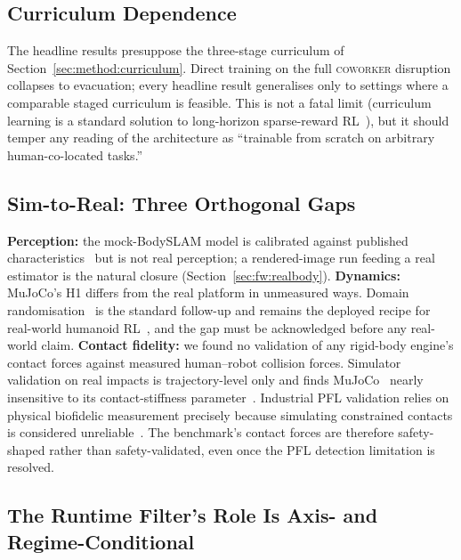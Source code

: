 \documentclass[11pt,a4paper]{report}
\newcommand{\pfl}{PFL}
\newcommand{\coworker}{\textsc{coworker}}
\newcommand{\bodyslampp}{BodySLAM\nolinebreak[4]\hspace{-.05em}\raisebox{.2ex}{\scriptsize ++}}
\begin{document}
\subsection{Curriculum Dependence}
\label{sec:disc:curriculum}

The headline results presuppose the three-stage curriculum of
Section~\ref{sec:method:curriculum}. Direct training on the full
\coworker{} disruption collapses to evacuation; every headline
result generalises only to settings where a comparable staged
curriculum is feasible. This is not a fatal limit (curriculum
learning is a standard solution to long-horizon sparse-reward
RL~\cite{narvekar2020curriculum,openai2019solving}), but it
should temper any reading of the architecture as ``trainable from
scratch on arbitrary human-co-located tasks.''

\subsection{Sim-to-Real: Three Orthogonal Gaps}
\label{sec:disc:sim2real}

\textbf{Perception:} the mock-\bodyslampp{} model is calibrated
against published characteristics~\cite{henning2023bodyslampp} but
is not real perception; a rendered-image run feeding a real
estimator is the natural closure
(Section~\ref{sec:fw:realbody}). \textbf{Dynamics:} MuJoCo's H1
differs from the real platform in unmeasured ways. Domain
randomisation~\cite{tobin2017domainrand}
is the standard follow-up and remains the deployed recipe for
real-world humanoid RL~\cite{radosavovic2024humanoid}, and the gap
must be acknowledged before any real-world claim. \textbf{Contact
fidelity:} we found no validation of any rigid-body engine's contact
forces against measured human--robot collision forces.
Simulator validation on real impacts is trajectory-level only and
finds MuJoCo~\cite{todorov2012mujoco} nearly insensitive to its
contact-stiffness parameter~\cite{acosta2022simvalidation}. Industrial
\pfl{} validation relies on physical biofidelic measurement precisely
because simulating constrained contacts is considered
unreliable~\cite{schlotzhauer2022pfl,svarny2020collision}. The
benchmark's contact forces are therefore safety-shaped rather than
safety-validated, even once the \pfl{} detection limitation is
resolved.

\subsection{The Runtime Filter's Role Is Axis- and Regime-Conditional}
\label{sec:disc:filter-role}
\end{document}
